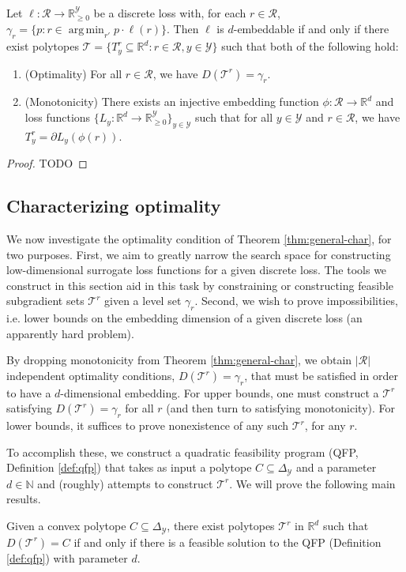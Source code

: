 \documentclass[anon]{colt2020} %
\newcommand{\reals}{\mathbb{R}}
\newcommand{\simplex}{\Delta_\Y}
\newcommand{\R}{\mathcal{R}}
\newcommand{\T}{\mathcal{T}}
\newcommand{\Y}{\mathcal{Y}}
\DeclareMathOperator*{\argmin}{arg\,min}
\begin{document}
\begin{theorem} \label{thm:general-char}
  Let $\ell: \R \to \reals_{\geq 0}^{\Y}$ be a discrete loss with, for each $r \in \R$, $\gamma_r = \{p : r \in \argmin_{r'} p \cdot \ell(r)\}$.
  Then $\ell$ is $d$-embeddable if and only if there exist polytopes $\T = \{T^r_y \subseteq \reals^d : r \in \R, y \in \Y\}$ such that both of the following hold:
  \begin{enumerate}
    \item (Optimality) For all $r \in \R$, we have $D(\T^r) = \gamma_r$.
    \item (Monotonicity) There exists an injective embedding function $\phi : \R \to \reals^d$ and loss functions $\{L_y : \reals^d \to \reals^\Y_{\geq 0}\}_{y \in \Y}$ such that for all $y \in \Y$ and $r \in \R$, we have $T^r_y = \partial L_y(\phi(r))$.
  \end{enumerate}
\end{theorem}
\begin{proof}
  TODO
\end{proof}


\subsection{Characterizing optimality}\label{subsec:opt-conditions}

We now investigate the optimality condition of Theorem \ref{thm:general-char}, for two purposes.
First, we aim to greatly narrow the search space for constructing low-dimensional surrogate loss functions for a given discrete loss.
The tools we construct in this section aid in this task by constraining or constructing feasible subgradient sets $\T^r$ given a level set $\gamma_r$.
Second, we wish to prove impossibilities, i.e. lower bounds on the embedding dimension of a given discrete loss (an apparently hard problem).

By dropping monotonicity from Theorem \ref{thm:general-char}, we obtain $|\R|$ independent optimality conditions, $D(\T^r) = \gamma_r$, that must be satisfied in order to have a $d$-dimensional embedding.
For upper bounds, one must construct a $\T^r$ satisfying $D(\T^r) = \gamma_r$ for all $r$ (and then turn to satisfying monotonicity).
For lower bounds, it suffices to prove nonexistence of any such $\T^r$, for any $r$.

To accomplish these, we construct a quadratic feasibility program (QFP, Definition \ref{def:qfp}) that takes as input a polytope $C \subseteq \simplex$ and a parameter $d \in \mathbb{N}$ and (roughly) attempts to construct $\T^r$.
We will prove the following main results.
\begin{theorem} \label{thm:opt-iff-qfp}
  Given a convex polytope $C \subseteq \simplex$, there exist polytopes $\T^r$ in $\reals^d$ such that $D(\T^r) = C$ if and only if there is a feasible solution to the QFP (Definition \ref{def:qfp}) with parameter $d$.
\end{theorem}
\end{document}
